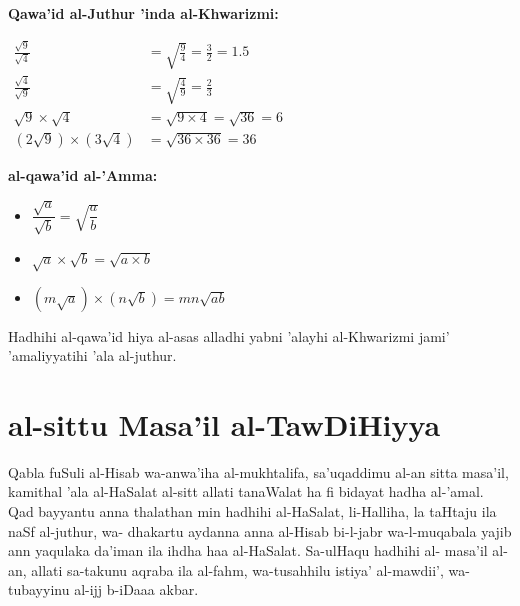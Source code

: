 \documentclass[11pt,a4paper]{book}
\begin{document}
\begin{mathexplain}
\textbf{Qawa'id al-Juthur 'inda al-Khwarizmi:}

\begin{center}
$\begin{aligned}
  \frac{\sqrt{9}}{\sqrt{4}} &= \sqrt{\frac{9}{4}} = \frac{3}{2} = 1.5 \\
  \frac{\sqrt{4}}{\sqrt{9}} &= \sqrt{\frac{4}{9}} = \frac{2}{3} \\
  \sqrt{9} \times \sqrt{4} &= \sqrt{9 \times 4} = \sqrt{36} = 6 \\
  (2\sqrt{9}) \times (3\sqrt{4}) &= \sqrt{36 \times 36} = 36
\end{aligned}$
\end{center}

\textbf{al-qawa'id al-'Amma:}
\begin{itemize}
  \item $\dfrac{\sqrt{a}}{\sqrt{b}} = \sqrt{\dfrac{a}{b}}$
  \item $\sqrt{a} \times \sqrt{b} = \sqrt{a \times b}$
  \item $(m\sqrt{a}) \times (n\sqrt{b}) = mn\sqrt{ab}$
\end{itemize}

Hadhihi al-qawa'id hiya al-asas alladhi yabni 'alayhi al-Khwarizmi
jami' 'amaliyyatihi 'ala al-juthur.
\end{mathexplain}

\newpage

\chapter{al-sittu Masa'il al-TawDiHiyya}
\label{ch:six-problems}

\begin{originaltext}
Qabla fuSuli al-Hisab wa-anwa'iha al-mukhtalifa, sa'uqaddimu al-an
sitta masa'il, kamithal 'ala al-HaSalat al-sitt allati tanaWalat
ha fi bidayat hadha al-'amal. Qad bayyantu anna thalathan min
hadhihi al-HaSalat, li-Halliha, la taHtaju ila naSf al-juthur, wa-
dhakartu aydanna anna al-Hisab bi-l-jabr wa-l-muqabala yajib ann
yaqulaka da'iman ila ihdha haa al-HaSalat. Sa-ulHaqu hadhihi al-
masa'il al-an, allati sa-takunu aqraba ila al-fahm, wa-tusahhilu
istiya' al-mawdii', wa-tubayyinu al-ijj b-iDaaa akbar.
\end{originaltext}
\end{document}
